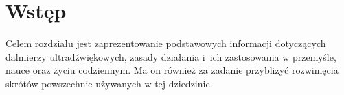 \chapter{Wstęp}
\label{wstep}

Celem rozdziału jest zaprezentowanie podstawowych informacji dotyczących dalmierzy ultradźwiękowych, zasady działania i~ich zastosowania w przemyśle, nauce oraz życiu codziennym. 
Ma on również za zadanie przybliżyć rozwinięcia skrótów powszechnie używanych w tej dziedzinie.
